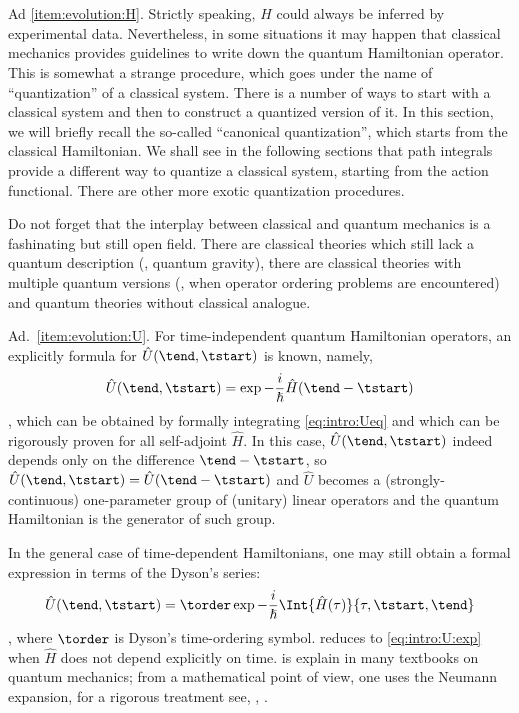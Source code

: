 Ad \cref{item:evolution:H}.   Strictly speaking, $\hat{H}$ could always be
inferred by experimental data.  Nevertheless, in some situations it may happen
that classical mechanics provides guidelines to write down the quantum
Hamiltonian operator.  This is somewhat a strange procedure, which goes under
the name of ``quantization'' of a classical system.  There is a number of ways
to start with a classical system and then to construct a quantized version of
it.  In this section, we will briefly recall the so-called ``canonical
quantization'', which starts from the classical Hamiltonian. We shall see in the
following sections that path integrals provide a different way to quantize a
classical system, starting from the action functional.  There are other more
exotic quantization procedures.

\begin{remark}

   Do not forget that the interplay between classical and quantum mechanics is a
   fashinating but still open field.  There are classical theories which still
   lack a quantum description (\eg, quantum gravity), there are classical
   theories with multiple quantum versions (\eg, when operator ordering problems
   are encountered) and  quantum theories without classical analogue. 

\end{remark}

Ad.~\cref{item:evolution:U}.   For time-independent quantum Hamiltonian operators, an
explicitly formula for $\hat{U}(\tend, \tstart)$ is known, namely,
\begin{dmath}[label={intro:U:exp}]
   \hat{U}(\tend , \tstart) = \exp{ - \frac{i}{\hslash} \hat{H} (\tend-\tstart) }
\end{dmath},
which can be obtained by formally integrating \cref{eq:intro:Ueq} and which can
be rigorously proven for all self-adjoint $\hat{H}$.  In this  case,
$\hat{U}(\tend, \tstart)$ indeed depends only on the difference $\tend-\tstart$,
so $\hat{U}(\tend, \tstart) = \hat{U}(\tend-\tstart)$ and $\hat{U}$ becomes  a
(strongly-continuous) one-parameter  group of (unitary) linear operators and the
quantum Hamiltonian is the generator of such group.


In the general case of time-dependent Hamiltonians, one may still obtain a
formal expression in terms of the Dyson's series:
\begin{dmath}[label={intro:U:Texp}]
   \hat{U}(\tend, \tstart) = \torder\exp{ - \frac{i}{\hslash}
      \Int{\hat{H}(\tau)}{\tau, \tstart, \tend}}
\end{dmath},
where $\torder$ is Dyson's time-ordering symbol. 
 reduces to \cref{eq:intro:U:exp} when $\hat{H}$ does not
depend explicitly on time.   is explain in many textbooks
on quantum mechanics; from  a mathematical point of view, one uses the Neumann
expansion, for a rigorous treatment see, \eg,
\textcite[\S~X.12]{Reed.Simon:1975}.


